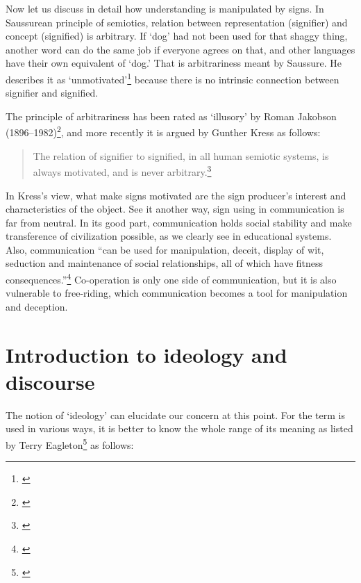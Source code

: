 Now let us discuss in detail how understanding is manipulated by signs. In Saussurean principle of semiotics, relation between representation (signifier) and concept (signified) is arbitrary. If `dog' had not been used for that shaggy thing, another word can do the same job if everyone agrees on that, and other languages have their own equivalent of `dog.' That is arbitrariness meant by Saussure. He describes it as `unmotivated'\footnote{\citealp[p.~69]{saussure:course}} because there is no intrinsic connection between signifier and signified.

The principle of arbitrariness has been rated as `illusory' by Roman Jakobson (1896--1982)\footnote{\citealp[p.~524]{jakobson:selected2}}, and more recently it is argued by Gunther Kress as follows:

\begin{quote}
The relation of signifier to signified, in all human semiotic systems, is always motivated, and is never arbitrary.\footnote{\citealp[p.~173]{kress:against}}
\end{quote}

In Kress's view, what make signs motivated are the sign producer's interest and characteristics of the object. See it another way, sign using in communication is far from neutral. In its good part, communication holds social stability and make transference of civilization possible, as we clearly see in educational systems. Also, communication ``can be used for manipulation, deceit, display of wit, seduction and maintenance of social relationships, all of which have fitness consequences.''\footnote{\citealp[p.~141]{origgisperber:evolution}} Co-operation is only one side of communication, but it is also vulnerable to free-riding, which communication becomes a tool for manipulation and deception.

\clearpage
{}
{}
\section*{Introduction to ideology and discourse}

The notion of `ideology' can elucidate our concern at this point. For the term is used in various ways, it is better to know the whole range of its meaning as listed by Terry Eagleton\footnote{\citealp[pp.~1--2]{eagleton:ideology}} as follows:

